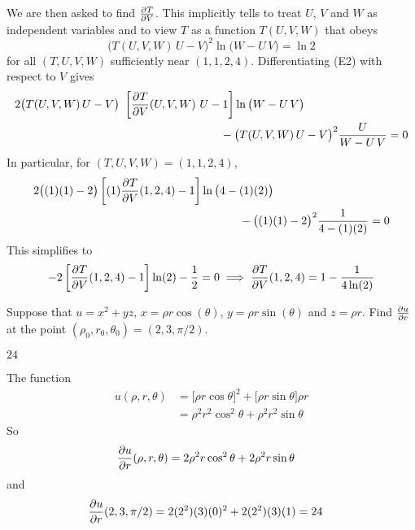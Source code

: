 \begin{solution}
We are then asked to find $\pdiff{T}{V}$. This implicitly tells to
treat $U$, $V$ and $W$ as independent variables and to view $T$
as a function $T(U,V,W)$ that obeys 
\begin{equation*}
\big(T(U,V,W)\, U-V\big)^2 \ln\big(W-U\,V\big) = \ln 2
\tag{E2}\end{equation*}
for all $(T, U, V, W)$ sufficiently near $(1, 1, 2, 4)$.
Differentiating (E2) with respect to $V$ gives
\begin{align*}
&2\big(T(U,V,W)\, U-V\big)\ \left[\pdiff{T}{V}(U,V,W)\ U-1\right]
            \ln\big(W-U\,V\big) \\
&\hskip2.5in
  -\big(T(U,V,W)\, U-V\big)^2 \frac{U}{W-U\,V} = 0
\end{align*}
In particular, for $(T, U, V, W)=(1, 1, 2, 4)$,
\begin{align*}
&2\big((1)(1)-2\big)
         \left[ (1)\pdiff{T}{V}(1,2,4)-1\right] 
            \ln\big(4-(1)(2)\big) \\
&\hskip2.5in
  -\big((1)(1)-2\big)^2 \frac{1}{4-(1)(2)} = 0
\end{align*}
This simplifies to
\begin{align*}
-2\left[\pdiff{T}{V}(1,2,4)-1\right] \ln(2) -\frac{1}{2}=0 
\implies
\pdiff{T}{V}(1,2,4) = 1 -\frac{1}{4\ln(2)} %
\end{align*}
\end{solution}

\begin{question}[M200 2013D] %
Suppose that $u = x^2 + yz$, $x = \rho r \cos(\theta)$, 
$y = \rho r \sin(\theta)$ and $z = \rho r$. Find $\pdiff{u}{r}$
at the point $(\rho_0 , r_0 , \theta_0) = (2, 3, \pi/2)$.
\end{question}

%

\begin{answer}
$24$
\end{answer}

\begin{solution}
The function
\begin{align*}
u(\rho, r,\theta) &= \big[\rho r\cos\theta\big]^2 
                      +\big[\rho r\sin\theta\big] \rho r \\
&=\rho^2 r^2\cos^2\theta +\rho^2 r^2\sin\theta
\end{align*}
So 
\begin{align*}
\pdiff{u}{r}(\rho, r,\theta) 
&=2 \rho^2 r\cos^2\theta +2 \rho^2 r\sin\theta
\end{align*}
and
\begin{align*}
\pdiff{u}{r}(2, 3,\pi/2) 
&=2 (2^2) (3) (0)^2 +2 (2^2) (3) (1)
=24
\end{align*}
\end{solution}

